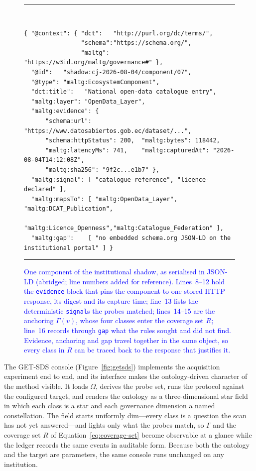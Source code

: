 \documentclass[engproc,proceedingpaper,submit,moreauthors]{Definitions/mdpi}
\begin{document}
\begin{figure}[H]
\centering
\begin{minipage}{\textwidth}
\footnotesize
\rule{\textwidth}{0.6pt}\\[-4pt]
\begin{lstlisting}[style=jsonld]
{ "@context": { "dct":   "http://purl.org/dc/terms/",
                "schema":"https://schema.org/",
                "maltg": "https://w3id.org/maltg/governance#" },
  "@id":   "shadow:cj-2026-08-04/component/07",
  "@type": "maltg:EcosystemComponent",
  "dct:title":   "National open-data catalogue entry",
  "maltg:layer": "OpenData_Layer",
  "maltg:evidence": {
      "schema:url":  "https://www.datosabiertos.gob.ec/dataset/...",
      "schema:httpStatus": 200,  "maltg:bytes": 118442,
      "maltg:latencyMs": 741,    "maltg:capturedAt": "2026-08-04T14:12:08Z",
      "maltg:sha256": "9f2c...e1b7" },
  "maltg:signal": [ "catalogue-reference", "licence-declared" ],
  "maltg:mapsTo": [ "maltg:OpenData_Layer",  "maltg:DCAT_Publication",
                    "maltg:Licence_Openness","maltg:Catalogue_Federation" ],
  "maltg:gap":    [ "no embedded schema.org JSON-LD on the institutional portal" ] }
\end{lstlisting}
\vspace{-8pt}\rule{\textwidth}{0.6pt}
\end{minipage}
\caption{\textcolor{blue}{One component of the institutional shadow, as serialised in JSON-LD (abridged; line numbers added for reference). Lines~8--12 hold the \texttt{evidence} block that pins the component to one stored HTTP response, its digest and its capture time; line~13 lists the deterministic \texttt{signal}s the probes matched; lines~14--15 are the anchoring $\Gamma(v)$, whose four classes enter the coverage set $R$; line~16 records through \texttt{gap} what the rules sought and did not find. Evidence, anchoring and gap travel together in the same object, so every class in $R$ can be traced back to the response that justifies it.}\label{fig:jsonld}}
\end{figure}

    The GET-SDS console (Figure~\ref{fig:getsds}) implements the acquisition experiment end to end, and its interface makes the ontology-driven character of the method visible. It loads $\Omega$, derives the probe set, runs the protocol against the configured target, and renders the ontology as a three-dimensional star field in which each class is a star and each governance dimension a named constellation. The field starts uniformly dim---every class is a question the scan has not yet answered---and lights only what the probes match, so $\Gamma$ and the coverage set $R$ of Equation~\eqref{eq:coverage-set} become observable at a glance while the ledger records the same events in auditable form. Because both the ontology and the target are parameters, the same console runs unchanged on any institution.
\end{document}
